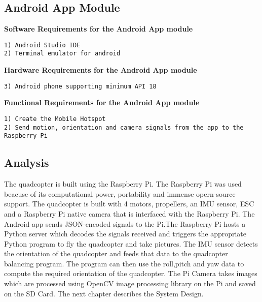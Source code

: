 \subsection{Android App Module}
\textbf{Software Requirements for the Android App module }
\begin{verbatim}
1) Android Studio IDE
2) Terminal emulator for android
\end{verbatim}
\textbf{Hardware Requirements for the Android App module}
\begin{verbatim}
3) Android phone supporting minimum API 18
\end{verbatim}
\textbf{Functional Requirements for the Android App module}
\begin{verbatim}
1) Create the Mobile Hotspot
2) Send motion, orientation and camera signals from the app to the Raspberry Pi
\end{verbatim}
\subsection{Analysis}
The quadcopter is built using the Raspberry Pi. The Raspberry Pi was used beacuse of its computational power, portability and immense opern-source support. The quadcopter is built with 4 motors, propellers, an IMU sensor, ESC and a Raspberry Pi native camera that is interfaced with the Raspberry Pi. The Android app sends JSON-encoded signals to the Pi.The Raspberry Pi hosts a Python server which decodes the signals received and triggers the appropriate Python program to fly the quadcopter and take pictures. The IMU sensor detects the orientation of the quadcopter and feeds that data to the quadcopter balancing program. The program can then use the roll,pitch and yaw data to compute the required orientation of the quadcopter. The Pi Camera takes images which are processed using OpenCV image processing library on the Pi and saved on the SD Card.
\newline
The next chapter describes the System Design.